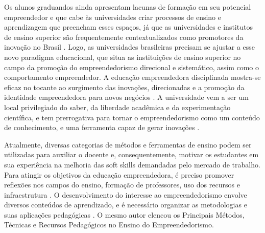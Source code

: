 Os alunos graduandos ainda apresentam lacunas de formação em seu potencial empreendedor e que cabe às universidades criar processos de ensino e aprendizagem que preencham esses espaços, já que as universidades e institutos de ensino superior são frequentemente contextualizados como promotores da inovação no Brasil \cite{pietrovski_alise_2019}. Logo, as universidades brasileiras precisam se ajustar a esse novo paradigma educacional, que situa as instituições de ensino superior no campo da promoção do empreendedorismo direcional e sistemático, assim como o comportamento empreendedor. A educação empreendedora disciplinada mostra-se eficaz no tocante ao surgimento das inovações, direcionadas e a promoção da identidade empreendedora para novos negócios \cite{jain_academics_2009}. A universidade vem a ser um local privilegiado do saber, da liberdade acadêmica e da experimentação científica, e tem prerrogativa para tornar o empreendedorismo como um conteúdo de conhecimento, e uma ferramenta capaz de gerar inovações \cite{dolabela_oficina_2008}. 


Atualmente, diversas categorias de métodos e ferramentas de ensino podem ser utilizadas para auxiliar o docente e, consequentemente, motivar os estudantes em sua experiência na melhoria das soft skills demandadas pelo mercado de trabalho. Para atingir os objetivos da educação empreendedora, é preciso promover reflexões nos campos do ensino, formação de professores, uso dos recursos e infraestrutura \cite{marques_experiencia_2019}. O desenvolvimento do interesse ao empreendedorismo envolve diversos conteúdos de aprendizado, e é necessário organizar as metodologias e suas aplicações pedagógicas \cite{rocha_avaliacao_2014}. O mesmo autor elencou os Principais Métodos, Técnicas e Recursos Pedagógicos no Ensino do Empreendedorismo.










